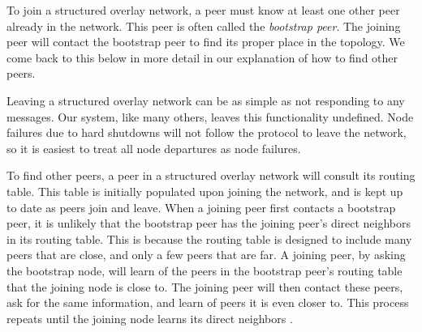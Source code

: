 \documentclass[12pt]{report}
\begin{document}
To join a structured overlay network, a peer must know at least one other peer already in the network. This peer is often called the \textit{bootstrap peer}. The joining peer will contact the bootstrap peer to find its proper place in the topology. We come back to this below in more detail in our explanation of how to find other peers.


Leaving a structured overlay network can be as simple as not responding to any messages. Our system, like many others, leaves this functionality undefined. Node failures due to hard shutdowns will not follow the protocol to leave the network, so it is easiest to treat all node departures as node failures.

To find other peers, a peer in a structured overlay network will consult its routing table. This table is initially populated upon joining the network, and is kept up to date as peers join and leave. When a joining peer first contacts a bootstrap peer, it is unlikely that the bootstrap peer has the joining peer's direct neighbors in its routing table. This is because the routing table is designed to include many peers that are close, and only a few peers that are far. A joining peer, by asking the bootstrap node, will learn of the peers in the bootstrap peer's routing table that the joining node is close to. The joining peer will then contact these peers, ask for the same information, and learn of peers it is even closer to. This process repeats until the joining node learns its direct neighbors \cite{p2pSurvey}.
\end{document}
